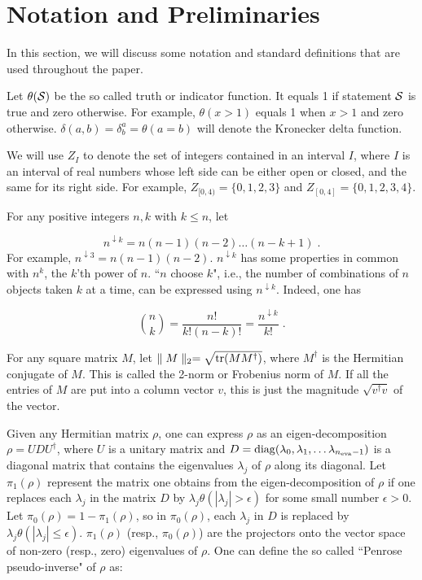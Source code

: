 \documentclass[12pt]{article}%
\newcommand{\tr}[0]{{\rm tr }}
\newcommand{\beq}{\begin{equation}}
\newcommand{\eeq}{\end{equation}}
\newcommand{\diag}[0]{{\rm diag}}
\newcommand{\cals}[0]{{\cal S}}
\newcommand{\lam}[0]{\lambda}
\newcommand{\nev}[0]{{n_{\rm eva}}}
\newcommand{\norm}[1]{\parallel #1 \parallel_2}
\newcommand{\darrow}[0]{{\downarrow}}
\begin{document}
\section{Notation and Preliminaries}
In this section, we will discuss some notation
and standard definitions that are used throughout the paper.

Let $\theta(\cals)$ be the so called truth or indicator
function. It equals 1 if statement $\cals$
is true and zero otherwise.
For example, $\theta(x>1)$ equals 1 when $x>1$
and zero otherwise.
$\delta(a, b)=\delta^a_b=\theta(a=b)$
 will denote the Kronecker
delta function.

We will use $Z_I$ to
denote the set of integers contained in an interval $I$,
where $I$ is an interval of real numbers
whose left side can be either
open or closed, and the same for its
right side. For example, $Z_{[0, 4)} = \{0, 1, 2, 3\}$
and
$Z_{[0, 4]} = \{0, 1, 2, 3, 4\}$.

For any positive integers $n,k$ with $k\leq n$, let

\beq
n^{\darrow k} = n(n-1)(n-2)\ldots (n-k+1)
\;.
\eeq
For example, $n^{\darrow 3} = n(n-1)(n-2)$.
$n^{\darrow k}$
has some properties in common with $n^k$,
the $k$'th power of $n$. ``$n$ choose $k$",
i.e.,
the number of combinations of $n$
objects taken $k$ at
a time, can be expressed using $n^{\darrow k}$.
Indeed, one has


\beq
{n\choose k} = \frac{n!}{k!(n-k)!}
 = \frac{n^{\darrow k}}{k!}
\;.
\eeq

For any square matrix $M$,  let
$\norm{M} = \sqrt{\tr(MM^\dag)}$,
where $M^\dag$ is the Hermitian
conjugate of $M$. This is called the 2-norm
or Frobenius norm of $M$. If all the entries of $M$ are
put into a column vector $v$, this is just the magnitude
$\sqrt{v^\dag v}$ of the vector.

Given any Hermitian matrix $\rho$, one can express $\rho$ as
an eigen-decomposition
$\rho=UDU^\dag$, where $U$ is a unitary
matrix and $D=\diag(
\lam_0, \lam_1, \ldots \lam_{\nev-1})$ is
a diagonal
matrix that contains the eigenvalues $\lam_j$  of $\rho$
along its diagonal. Let
$\pi_1(\rho)$ represent
the matrix one obtains
from the eigen-decomposition of $\rho$
 if one replaces
each $\lam_j$ in the matrix $D$
by $\lam_j\theta(|\lam_j|>\epsilon)$ for some small number
$\epsilon>0$. Let $\pi_0(\rho)=1-\pi_1(\rho)$,
so in $\pi_0(\rho)$, each $\lam_j$
in $D$ is replaced
by $\lam_j\theta(|\lam_j|\leq \epsilon)$.
$\pi_1(\rho)$ (resp., $\pi_0(\rho)$)
are the projectors onto the vector
space of non-zero (resp., zero)
eigenvalues of $\rho$. One can define the so called ``Penrose
pseudo-inverse" of $\rho$
 as:
\end{document}

